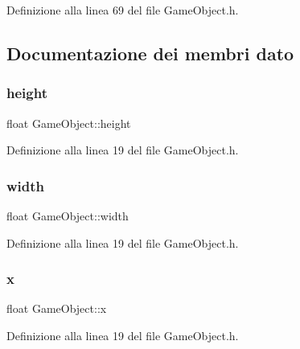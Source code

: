 Definizione alla linea 69 del file Game\+Object.\+h.



\subsection{Documentazione dei membri dato}
\mbox{\label{class_game_object_a0ae9c255f47b6148c26d0333a72d0625}} 
\subsubsection{\texorpdfstring{height}{height}}
{\footnotesize\ttfamily float Game\+Object\+::height\hspace{0.3cm}{\ttfamily [protected]}}



Definizione alla linea 19 del file Game\+Object.\+h.

\mbox{\label{class_game_object_af797cec05ff1d3cbc694fc7036add37b}} 
\subsubsection{\texorpdfstring{width}{width}}
{\footnotesize\ttfamily float Game\+Object\+::width\hspace{0.3cm}{\ttfamily [protected]}}



Definizione alla linea 19 del file Game\+Object.\+h.

\mbox{\label{class_game_object_ad4976cd29785cf9bd791148ff397c41e}} 
\subsubsection{\texorpdfstring{x}{x}}
{\footnotesize\ttfamily float Game\+Object\+::x\hspace{0.3cm}{\ttfamily [protected]}}



Definizione alla linea 19 del file Game\+Object.\+h.

\mbox{\label{class_game_object_a9ac54f1c686ecf5656139a829ed62041}} 
